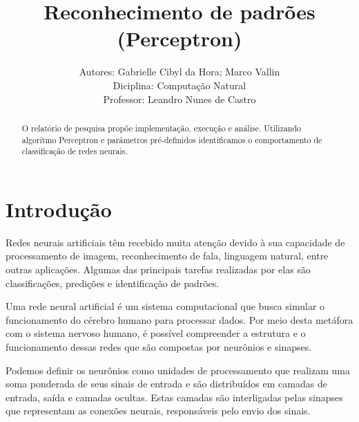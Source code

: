 \documentclass[runningheads]{llncs}
\begin{document}
%
\title{Reconhecimento de padrões (Perceptron)}
%
%
\pagestyle{plain}
\author{Autores: Gabrielle Cibyl da Hora; Marco Vallin \\ 
Diciplina: Computação Natural \\
Professor: Leandro Nunes de Castro} 
%
%
%
\maketitle              %
%
\begin{abstract}
O relatório de pesquisa propõe implementação, execução e análise. Utilizando algoritmo Perceptron e parâmetros pré-definidos identificamos o comportamento de classificação de redes neurais.

\end{abstract}
%
%
\section{Introdução}

Redes neurais artificiais têm recebido muita atenção devido à sua capacidade de processamento de imagem, reconhecimento de fala, linguagem natural, entre outras aplicações. Algumas das principais tarefas realizadas por elas são classificações, predições e identificação de padrões. \cite{Cao17} 

Uma rede neural artificial é um sistema computacional que busca simular o funcionamento do cérebro humano para processar dados. Por meio desta metáfora com o sistema nervoso humano, é possível compreender a estrutura e o funcionamento dessas redes que são compostas por neurônios e sinapses. \cite{Cao17}

Podemos definir os neurônios como unidades de processamento que realizam uma soma ponderada de seus sinais de entrada e são distribuídos em camadas de entrada, saída e camadas ocultas. Estas camadas são interligadas pelas sinapses que representam as conexões neurais, responsáveis pelo envio dos sinais. \cite{Cao17} \cite{M} 
\end{document}
